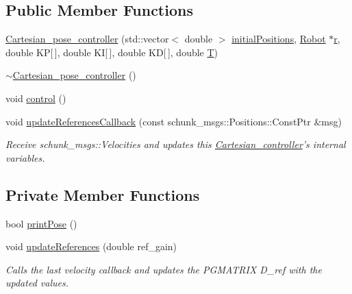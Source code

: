 \subsection*{Public Member Functions}
\begin{DoxyCompactItemize}
\item 
\hyperlink{classCartesian__pose__controller_ab33ba9d374ac39a6723b4c4507db12e8}{Cartesian\-\_\-pose\-\_\-controller} (std\-::vector$<$ double $>$ \hyperlink{classCartesian__pose__controller_a42433d7f2e4e03ccaac56e1f9a7a5027}{initial\-Positions}, \hyperlink{structRobot}{Robot} $\ast$\hyperlink{classCartesian__controller_a5562129951bd802e4ded77fc716c87a0}{r}, double K\-P\mbox{[}$\,$\mbox{]}, double K\-I\mbox{[}$\,$\mbox{]}, double K\-D\mbox{[}$\,$\mbox{]}, double \hyperlink{classCartesian__controller_a35c6ddbb9624878f2807ff644a33e832}{T})
\item 
\hyperlink{classCartesian__pose__controller_ab1339b9181d43b7560f9fc688dc4d047}{$\sim$\-Cartesian\-\_\-pose\-\_\-controller} ()
\item 
void \hyperlink{classCartesian__pose__controller_ab937d166862f2756eb3d08f37a0a090d}{control} ()
\item 
void \hyperlink{classCartesian__pose__controller_af9c1ec1f565375f50f8a15b16464f94d}{update\-References\-Callback} (const schunk\-\_\-msgs\-::\-Positions\-::\-Const\-Ptr \&msg)
\begin{DoxyCompactList}\small\item\em Receive schunk\-\_\-msgs\-::\-Velocities and updates this \hyperlink{classCartesian__controller}{Cartesian\-\_\-controller}'s internal variables. \end{DoxyCompactList}\end{DoxyCompactItemize}
\subsection*{Private Member Functions}
\begin{DoxyCompactItemize}
\item 
bool \hyperlink{classCartesian__pose__controller_ab55ab40074c82ba8cc010fe68fc76d5b}{print\-Pose} ()
\item 
void \hyperlink{classCartesian__pose__controller_a965f86a383eb205df10832626fac98af}{update\-References} (double ref\-\_\-gain)
\begin{DoxyCompactList}\small\item\em Calls the last velocity callback and updates the P\-G\-M\-A\-T\-R\-I\-X D\-\_\-ref with the updated values. \end{DoxyCompactList}\end{DoxyCompactItemize}

